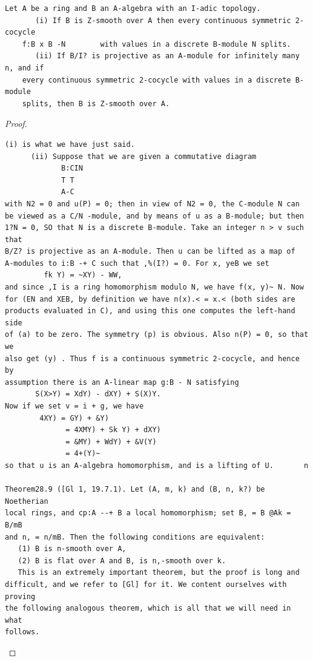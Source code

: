 \begin{theorem}\label{mcrt-auto-theorem-28-8}\uses{}
\begin{verbatim}
Let A be a ring and B an A-algebra with an I-adic topology.
       (i) If B is Z-smooth over A then every continuous symmetric 2-cocycle
    f:B x B -N        with values in a discrete B-module N splits.
       (ii) If B/I? is projective as an A-module for infinitely many n, and if
    every continuous symmetric 2-cocycle with values in a discrete B-module
    splits, then B is Z-smooth over A.
\end{verbatim}
\end{theorem}
\begin{proof}
\begin{verbatim}
(i) is what we have just said.
      (ii) Suppose that we are given a commutative diagram
             B:CIN
             T T
             A-C
with N2 = 0 and u(P) = 0; then in view of N2 = 0, the C-module N can
be viewed as a C/N -module, and by means of u as a B-module; but then
1?N = 0, SO that N is a discrete B-module. Take an integer n > v such that
B/Z? is projective as an A-module. Then u can be lifted as a map of
A-modules to i:B -+ C such that ,%(I?) = 0. For x, yeB we set
         fk Y) = ~XY) - WW,
and since ,I is a ring homomorphism modulo N, we have f(x, y)~ N. Now
for (EN and XEB, by definition we have n(x).< = x.< (both sides are
products evaluated in C), and using this one computes the left-hand side
of (a) to be zero. The symmetry (p) is obvious. Also n(P) = 0, so that we
also get (y) . Thus f is a continuous symmetric 2-cocycle, and hence by
assumption there is an A-linear map g:B - N satisfying
       S(X>Y) = XdY) - dXY) + S(X)Y.
Now if we set v = i + g, we have
        4XY) = GY) + &Y)
              = 4XMY) + Sk Y) + dXY)
              = &MY) + WdY) + &V(Y)
              = 4+(Y)~
so that u is an A-algebra homomorphism, and is a lifting of U.       n

Theorem28.9 ([Gl 1, 19.7.1). Let (A, m, k) and (B, n, k?) be Noetherian
local rings, and cp:A --+ B a local homomorphism; set B, = B @Ak = B/mB
and n, = n/mB. Then the following conditions are equivalent:
   (1) B is n-smooth over A,
   (2) B is flat over A and B, is n,-smooth over k.
   This is an extremely important theorem, but the proof is long and
difficult, and we refer to [Gl] for it. We content ourselves with proving
the following analogous theorem, which is all that we will need in what
follows.
\end{verbatim}
\end{proof}


